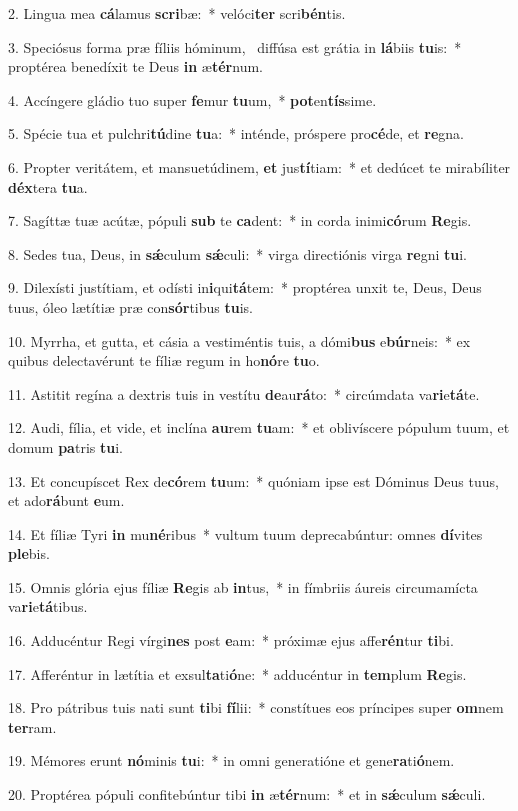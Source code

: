 2. Lingua mea \textbf{cá}lamus \textbf{scri}bæ:~*  velóci\textbf{ter} scri\textbf{bén}tis.\

3. Speciósus forma præ fíliis hóminum, \dag\  diffúsa est grátia in \textbf{lá}biis \textbf{tu}is:~*  proptérea benedíxit te Deus \textbf{in} æ\textbf{tér}num.\

4. Accíngere gládio tuo super \textbf{fe}mur \textbf{tu}um,~*  \textbf{pot}en\textbf{tís}sime.\

5. Spécie tua et pulchri\textbf{tú}dine \textbf{tu}a:~*  inténde, próspere pro\textbf{cé}de, et \textbf{re}gna.\

6. Propter veritátem, et mansuetúdinem, \textbf{et} jus\textbf{tí}tiam:~*  et dedúcet te mirabíliter \textbf{déx}tera \textbf{tu}a.\

7. Sagíttæ tuæ acútæ, pópuli \textbf{sub} te \textbf{ca}dent:~*  in corda inimi\textbf{có}rum \textbf{Re}gis.\

8. Sedes tua, Deus, in \textbf{sǽ}culum \textbf{sǽ}culi:~*  virga directiónis virga \textbf{re}gni \textbf{tu}i.\

9. Dilexísti justítiam, et odísti in\textbf{i}qui\textbf{tá}tem:~*  proptérea unxit te, Deus, Deus tuus, óleo lætítiæ præ con\textbf{sór}tibus \textbf{tu}is.\

10. Myrrha, et gutta, et cásia a vestiméntis tuis, a dómi\textbf{bus} e\textbf{búr}neis:~*  ex quibus delectavérunt te fíliæ regum in ho\textbf{nó}re \textbf{tu}o.\

11. Astitit regína a dextris tuis in vestítu \textbf{de}au\textbf{rá}to:~*  circúmdata va\textbf{ri}e\textbf{tá}te.\

12. Audi, fília, et vide, et inclína \textbf{au}rem \textbf{tu}am:~*  et oblivíscere pópulum tuum, et domum \textbf{pa}tris \textbf{tu}i.\

13. Et concupíscet Rex de\textbf{có}rem \textbf{tu}um:~*  quóniam ipse est Dóminus Deus tuus, et ado\textbf{rá}bunt \textbf{e}um.\

14. Et fíliæ Tyri \textbf{in} mu\textbf{né}ribus~*  vultum tuum deprecabúntur: omnes \textbf{dí}vites \textbf{ple}bis.\

15. Omnis glória ejus fíliæ \textbf{Re}gis ab \textbf{in}tus,~*  in fímbriis áureis circumamícta va\textbf{ri}e\textbf{tá}tibus.\

16. Adducéntur Regi vírgi\textbf{nes} post \textbf{e}am:~*  próximæ ejus affe\textbf{rén}tur \textbf{ti}bi.\

17. Afferéntur in lætítia et exsul\textbf{ta}ti\textbf{ó}ne:~*  adducéntur in \textbf{tem}plum \textbf{Re}gis.\

18. Pro pátribus tuis nati sunt \textbf{ti}bi \textbf{fí}lii:~*  constítues eos príncipes super \textbf{om}nem \textbf{ter}ram.\

19. Mémores erunt \textbf{nó}minis \textbf{tu}i:~*  in omni generatióne et gene\textbf{ra}ti\textbf{ó}nem.\

20. Proptérea pópuli confitebúntur tibi \textbf{in} æ\textbf{tér}num:~*  et in \textbf{sǽ}culum \textbf{sǽ}culi.\

